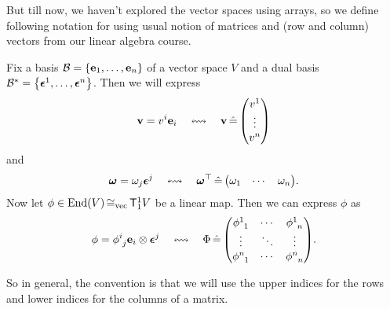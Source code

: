 But till now, we haven't explored the vector spaces using arrays, so we define following notation for using usual notion of matrices and (row and column) vectors from our linear algebra course.
\begin{remark}
    Fix a basis \(\mathcal B = \qty{\vb{e}_1, \ldots, \vb{e}_n}\) of a vector space \(V\) and a dual basis \(\mathcal B^* = \qty{\vb*{\epsilon}^1, \ldots, \vb*{\epsilon}^n}\). Then we will express
    \begin{equation}
        \vb{v} = v^i \vb{e}_i \quad \leftrightsquigarrow \quad \vb{v} \hateq \mqty(v^1 \\ \vdots \\ v^n)
    \end{equation}
    and
    \begin{equation}
        \vb*{\omega} = \omega_j \vb*{\epsilon}^j \quad \leftrightsquigarrow \quad \vb*{\omega}\trans \hateq \mqty(\omega_1 & \cdots & \omega_n).
    \end{equation}
    Now let \(\phi \in \operatorname{End}(V) \operatorname{\cong_{\text{vec}}} \mathsf{T}^1_1 V\) be a linear map. Then we can express \(\phi\) as
    \begin{equation}
        \phi = \tensor{\phi}{^{i}_{j}} \vb{e}_i \otimes \vb*{\epsilon}^j \quad \leftrightsquigarrow \quad \Phi \hateq \mqty(\tensor{\phi}{^{1}_{1}} & \cdots & \tensor{\phi}{^{1}_{n}} \\ \vdots & \ddots & \vdots \\ \tensor{\phi}{^{n}_{1}} & \cdots & \tensor{\phi}{^{n}_{n}}).
    \end{equation}
\end{remark}
So in general, the convention is that we will use the upper indices for the rows and lower indices for the columns of a matrix.

